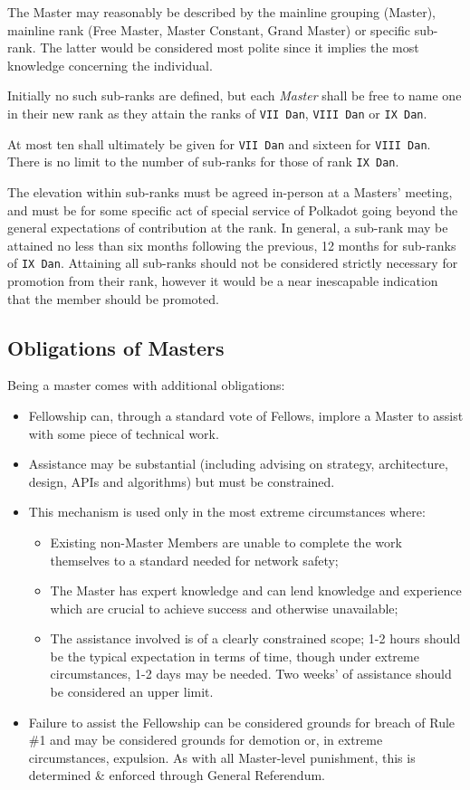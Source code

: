\documentclass[9pt,oneside]{amsart}
\begin{document}
The Master may reasonably be described by the mainline grouping (Master), mainline rank (Free Master, Master Constant, Grand Master) or specific sub-rank. The latter would be considered most polite since it implies the most knowledge concerning the individual.

Initially no such sub-ranks are defined, but each \emph{Master} shall be free to name one in their new rank as they attain the ranks of \texttt{VII\ Dan}, \texttt{VIII\ Dan} or \texttt{IX\ Dan}.

At most ten shall ultimately be given for \texttt{VII\ Dan} and sixteen for \texttt{VIII\ Dan}. There is no limit to the number of sub-ranks for those of rank \texttt{IX\ Dan}.

The elevation within sub-ranks must be agreed in-person at a Masters' meeting, and must be for some specific act of special service of Polkadot going beyond the general expectations of contribution at the rank. In general, a sub-rank may be attained no less than six months following the previous, 12 months for sub-ranks of \texttt{IX\ Dan}. Attaining all sub-ranks should not be considered strictly necessary for promotion from their rank, however it would be a near inescapable indication that the member should be promoted.

\subsection{Obligations of Masters}\label{obligations-of-masters}

Being a master comes with additional obligations:

\begin{itemize}
  \item Fellowship can, through a standard vote of Fellows, implore a Master to assist with some piece of technical work.
  \item Assistance may be substantial (including advising on strategy, architecture, design, APIs and algorithms) but must be constrained.
  \item This mechanism is used only in the most extreme circumstances where:
    \begin{itemize}
      \item Existing non-Master Members are unable to complete the work themselves to a standard needed for network safety;
      \item The Master has expert knowledge and can lend knowledge and experience which are crucial to achieve success and otherwise unavailable;
      \item The assistance involved is of a clearly constrained scope; 1-2 hours should be the typical expectation in terms of time, though under extreme circumstances, 1-2 days may be needed. Two weeks' of assistance should be considered an upper limit.
    \end{itemize}
  \item Failure to assist the Fellowship can be considered grounds for breach of Rule \#1 and may be considered grounds for demotion or, in extreme circumstances, expulsion. As with all Master-level punishment, this is determined \& enforced through General Referendum.
\end{itemize}
\end{document}
